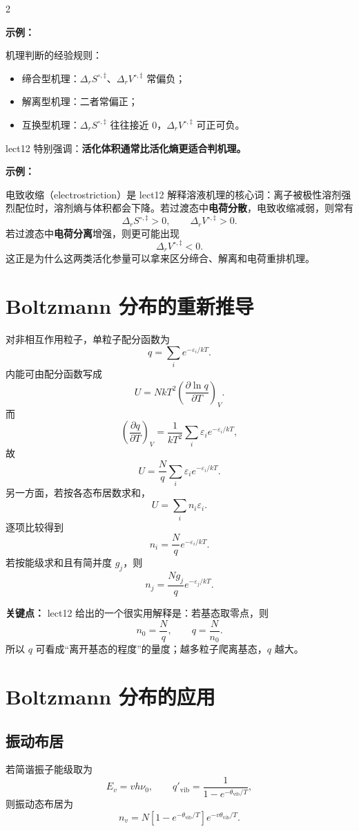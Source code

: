 \documentclass[a4paper,9pt]{article}
\newenvironment{keypoint}
{\par\vspace{0.3em}\noindent\begin{tcolorbox}[colback=keybg,colframe=keycolor,boxrule=0.5pt,arc=2pt,left=2pt,right=2pt,top=2pt,bottom=2pt,boxsep=0pt]\noindent\textcolor{keycolor}{\textbf{关键点：}}}
{\end{tcolorbox}\par\vspace{0.3em}}
\newenvironment{examplebox}
{\par\vspace{0.3em}\noindent\begin{tcolorbox}[colback=boxbg,colframe=derivcolor,boxrule=0.5pt,arc=2pt,left=2pt,right=2pt,top=2pt,bottom=2pt,boxsep=0pt]\scriptsize\noindent\textcolor{derivcolor}{\textbf{示例：}}\par\setlength{\parskip}{0.1ex}\setlength{\itemsep}{0pt}\setlength{\parsep}{0pt}}
{\end{tcolorbox}\par\vspace{0.3em}}
\begin{document}
\begin{multicols}{2}
\begin{examplebox}
机理判断的经验规则：
\begin{itemize}
  \item 缔合型机理：$\Delta_rS^{\circ,\ddagger}$、$\Delta_rV^{\circ,\ddagger}$ 常偏负；
  \item 解离型机理：二者常偏正；
  \item 互换型机理：$\Delta_rS^{\circ,\ddagger}$ 往往接近 0，$\Delta_rV^{\circ,\ddagger}$ 可正可负。
\end{itemize}
lect12 特别强调：\textbf{活化体积通常比活化熵更适合判机理。}
\end{examplebox}

\begin{examplebox}
电致收缩（electrostriction）是 lect12 解释溶液机理的核心词：离子被极性溶剂强烈配位时，溶剂熵与体积都会下降。若过渡态中\textbf{电荷分散}，电致收缩减弱，则常有
\[
\Delta_rS^{\circ,\ddagger}>0,\qquad \Delta_rV^{\circ,\ddagger}>0.
\]
若过渡态中\textbf{电荷分离}增强，则更可能出现
\[
\Delta_rV^{\circ,\ddagger}<0.
\]
这正是为什么这两类活化参量可以拿来区分缔合、解离和电荷重排机理。
\end{examplebox}

\section{Boltzmann 分布的重新推导}

对非相互作用粒子，单粒子配分函数为
\[
q=\sum_i e^{-\varepsilon_i/kT}.
\]
内能可由配分函数写成
\[
U=NkT^2\left(\frac{\partial \ln q}{\partial T}\right)_V.
\]
而
\[
\left(\frac{\partial q}{\partial T}\right)_V=\frac{1}{kT^2}\sum_i \varepsilon_i e^{-\varepsilon_i/kT},
\]
故
\[
U=\frac{N}{q}\sum_i \varepsilon_i e^{-\varepsilon_i/kT}.
\]
另一方面，若按各态布居数求和，
\[
U=\sum_i n_i\varepsilon_i.
\]
逐项比较得到
\[
n_i=\frac{N}{q}e^{-\varepsilon_i/kT}.
\]
若按能级求和且有简并度 $g_j$，则
\[
n_j=\frac{Ng_j}{q}e^{-\varepsilon_j/kT}.
\]

\begin{keypoint}
lect12 给出的一个很实用解释是：若基态取零点，则
\[
n_0=\frac{N}{q},
\qquad q=\frac{N}{n_0}.
\]
所以 $q$ 可看成“离开基态的程度”的量度；越多粒子爬离基态，$q$ 越大。
\end{keypoint}

\section{Boltzmann 分布的应用}

\subsection{振动布居}
若简谐振子能级取为
\[
E_v=vh\nu_0,
\qquad
q'_{\mathrm{vib}}=\frac{1}{1-e^{-\theta_{\mathrm{vib}}/T}},
\]
则振动态布居为
\[
n_v=N\left[1-e^{-\theta_{\mathrm{vib}}/T}\right]e^{-v\theta_{\mathrm{vib}}/T}.
\]


\end{multicols}
\end{document}
